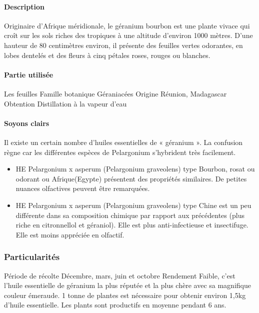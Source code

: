 \documentclass[12pt,a4wide]{article}
\begin{document}
\paragraph{Description}
\label{sec-4-7-2-1}
Originaire d'Afrique méridionale, le géranium bourbon est une plante vivace qui croît sur les sols riches des tropiques à une altitude d'environ 1000 mètres. D'une hauteur de 80 centimètres environ, il présente des feuilles vertes odorantes, en lobes dentelés et des fleurs à cinq pétales roses, rouges ou blanches.
\paragraph{Partie utilisée}
\label{sec-4-7-2-2}
Les feuilles
Famille botanique
Géraniacées
Origine
Réunion, Madagascar
Obtention
Distillation à la vapeur d'eau

\paragraph{Soyons clairs}
\label{sec-4-7-2-3}
Il existe un certain nombre d'huiles essentielles de « géranium ». La confusion règne car les différentes espèces de Pelargonium s'hybrident très facilement.
\begin{itemize}
\item HE Pelargonium x asperum (Pelargonium graveolens) type Bourbon, rosat ou odorant ou Afrique(Egypte) présentent des propriétés similaires. De petites nuances olfactives peuvent être remarquées.
\item HE Pelargonium x asperum (Pelargonium graveolens) type Chine est un peu différente dans sa composition chimique par rapport aux précédentes (plus riche en citronnellol et géraniol). Elle est plus anti-infectieuse et insectifuge. Elle est moins appréciée en olfactif.
\end{itemize}

\subsubsection{Particularités}
\label{sec-4-7-3}
Période de récolte
Décembre, mars, juin et octobre
Rendement
Faible, c'est l'huile essentielle de géranium la plus réputée et la plus chère avec sa magnifique couleur émeraude. 1 tonne de plantes est nécessaire pour obtenir environ 1,5kg d'huile essentielle.
Les plants sont productifs en moyenne pendant 6 ans.
\end{document}
